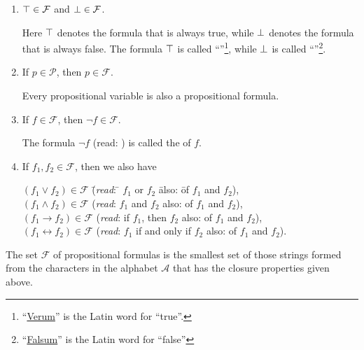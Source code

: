 \begin{enumerate}
\item $\top \in \mathcal{F}$ and $\bot \in \mathcal{F}$.

      Here $\top$   denotes the formula that is always true, while $\bot$
        denotes the formula that is always false.
      The formula $\top$ is called
      ``''\footnote{``\href{https://translate.google.com/?sl=la&tl=en&text=falsum&op=translate&hl=en}{Verum}''
        is the Latin word for ``true''.},  while $\bot$ is called 
      ``''\footnote{``\href{https://translate.google.com/?sl=la&tl=en&text=falsum&op=translate&hl=en}{Falsum}''
        is the Latin word for ``false''}.  
\item If $p \in \mathcal{P}$, then  $p \in \mathcal{F}$.

      Every propositional variable is also a propositional formula.
\item If $f \in \mathcal{F}$, then  $\neg f \in \mathcal{F}$.

      The formula  $\neg f$  (read: ) is called the  of $f$.
\item If $f_1, f_2 \in \mathcal{F}$, then we also have
      \begin{tabbing}
        $(f_1 \vee f_2) \in \mathcal{F}$  \hspace*{0.5cm} \= (\textsl{read}: \quad \= $f_1$ or $f_2$ \hspace*{2.3cm} \=
         also: \qquad\= of $f_1$ and $f_2$), \\
        $(f_1 \wedge f_2) \in \mathcal{F}$  \> (\textsl{read}: \> $f_1$ and $f_2$ \>
         also: \> of $f_1$ and $f_2$), \\
        $(f_1 \rightarrow f_2) \in \mathcal{F}$  \> (\textsl{read}:       \> if $f_1$, then $f_2$ \>
         also: \> of $f_1$ and $f_2$), \\
        $(f_1 \leftrightarrow f_2) \in \mathcal{F}$  \>
        (\textsl{read}:       \> $f_1$ if and only if $f_2$ \>
        also: \> of $f_1$ and $f_2$).            
      \end{tabbing}
\end{enumerate}
The set  $\mathcal{F}$ of propositional formulas is the smallest set of those strings formed from the characters
in the alphabet $\mathcal{A}$ that has the closure properties given above.

